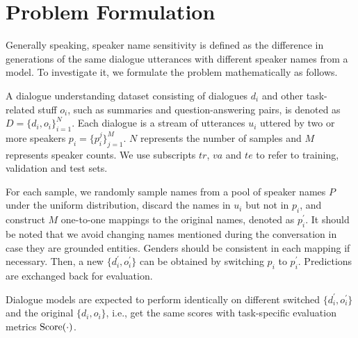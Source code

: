 \section{Problem Formulation}
\label{sec:problem}

Generally speaking, speaker name sensitivity is defined as the difference in generations of the same dialogue utterances with different speaker names from a model. To investigate it, we formulate the problem mathematically as follows.

A dialogue understanding dataset consisting of dialogues $d_i$ and other task-related stuff $o_i$, such as summaries and question-answering pairs, is denoted as $D=\{d_i, o_i\}_{i=1}^{N}$. Each dialogue is a stream of utterances $u_i$ uttered by two or more speakers $p_i=\{p_i^j\}_{j=1}^M$. $N$ represents the number of samples and $M$ represents speaker counts. We use subscripts $tr$, $va$ and $te$ to refer to training, validation and test sets.

For each sample, we randomly sample names from a pool of speaker names $P$ under the uniform distribution, discard the names in $u_i$ but not in $p_i$,
and construct $M$ one-to-one mappings to the original names, denoted as $p^\prime_i$. It should be noted that we avoid changing names mentioned during the conversation in case they are grounded entities. Genders should be consistent in each mapping if necessary. Then, a new $\{d^\prime_i, o^\prime_i\}$ can be obtained by switching $p_i$ to $p^\prime_i$. Predictions are exchanged back for evaluation.

Dialogue models are expected to perform identically on different switched $\{d^\prime_i, o^\prime_i\}$ and the original $\{d_i, o_i\}$, i.e., get the same scores with task-specific evaluation metrics $\rm{Score}(\cdot)$.






